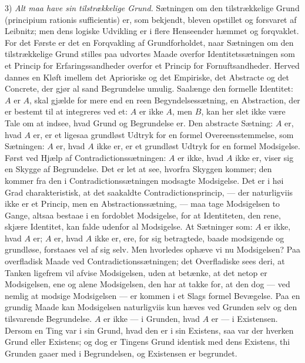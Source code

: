 \documentclass[12pt]{book}
\newcommand{\opage}[1]{\marginnote{\footnotesize\textit{[#1]}}}
\begin{document}
3) \emph{Alt maa have sin tilstrækkelige Grund.} Sætningen om den tilstrækkelige Grund
(principium rationis sufficientis) er, som bekjendt, bleven opstillet og forsvaret af
Leibnitz; men dens logiske Udvikling er i flere Henseender hæmmet og forqvaklet. For
det Første er det en Forqvakling af Grundforholdet, naar Sætningen om den
tilstrækkelige Grund stilles paa udvortes Maade overfor Identitetssætningen som et
Princip for Erfaringssandheder overfor et Princip for Fornuftsandheder. Herved dannes
en Kløft imellem det
\opage{100} Aprioriske og det Empiriske, det Abstracte og det Concrete, der gjør al sand
Begrundelse umulig. Saalænge den formelle Identitet: $A$ er $A$, skal gjælde for mere
end en reen Begyndelsessætning, en Abstraction, der er bestemt til at integreres ved
et: $A$ er ikke $A$, men $B$, kan her slet ikke være Tale om at indsee, hvad Grund og
Begrundelse er. Den abstracte Sætning: $A$ er, hvad $A$ er, er et ligesaa grundløst
Udtryk for en formel Overeensstemmelse, som Sætningen: $A$ er, hvad $A$ ikke er, er et
grundløst Udtryk for en formel Modsigelse. Først ved Hjælp af Contradictionssætningen:
$A$ er ikke, hvad $A$ ikke er, viser sig en Skygge af Begrundelse. Det er let at see,
hvorfra Skyggen kommer; den kommer fra den i Contradictionssætningen modsagte
Modsigelse. Det er i høi Grad charakteristisk, at det saakaldte Contradictionsprincip,
--- der naturligviis ikke er et Princip, men en Abstractionssætning, --- maa tage
Modsigelsen to Gange, altsaa bestaae i en fordoblet Modsigelse, for at Identiteten,
den rene, skjære Identitet, kan falde udenfor al Modsigelse. At Sætninger som: $A$ er
ikke, hvad $A$ er; $A$ er, hvad $A$ ikke er, ere, for sig betragtede, baade modsigende
og grundløse, forstaaes vel af sig selv. Men hvorledes ophæve vi nu Modsigelsen? Paa
overfladisk Maade ved Contradictionssætningen; det Overfladiske sees deri, at Tanken
ligefrem vil afvise Modsigelsen, uden at betænke, at det netop er Modsigelsen, ene og
alene Modsigelsen, den har at takke for, at den dog --- ved nemlig at modsige
Modsigelsen --- er kommen i et Slags formel Bevægelse. Paa en grundig Maade kan
Modsigelsen naturligviis kun hæves ved Grunden selv og den tilsvarende Begrundelse.
$A$ er ikke --- i Grunden, hvad $A$ er --- i Existensen. Dersom en Ting var i sin
Grund, hvad den er i sin Existens, saa var der hverken Grund eller Existens; og dog er
Tingens Grund identisk med dens Existens, thi Grunden gaaer med i Begrundelsen, og
Existensen er begrundet.
\end{document}
